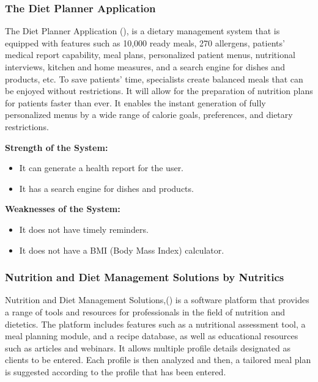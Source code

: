 \documentclass{article}
\begin{document}
\subsubsection{The Diet Planner Application}

The Diet Planner Application (\cite{dietplannerapp}), is a dietary management system that is equipped with features such as 10,000 ready meals, 270 allergens, patients' medical report capability, meal plans, personalized patient menus, nutritional interviews, kitchen and home measures, and a search engine for dishes and products, etc. To save patients' time, specialists create balanced meals that can be enjoyed without restrictions. It will allow for the preparation of nutrition plans for patients faster than ever. It enables the instant generation of fully personalized menus by a wide range of calorie goals, preferences, and dietary restrictions.

\textbf{Strength of the System:}
\begin{itemize}
\item It can generate a health report for the user.
\item It has a search engine for dishes and products.
\end{itemize}

\textbf{Weaknesses of the System:}
\begin{itemize}
\item It does not have timely reminders.
\item It does not have a BMI (Body Mass Index) calculator.
\end{itemize}

\subsubsection{Nutrition and Diet Management Solutions by Nutritics}

Nutrition and Diet Management Solutions,(\cite{nutritics}) is a software platform that provides a range of tools and resources for professionals in the field of nutrition and dietetics. The platform includes features such as a nutritional assessment tool, a meal planning module, and a recipe database, as well as educational resources such as articles and webinars. It allows multiple profile details designated as clients to be entered. Each profile is then analyzed and then, a tailored meal plan is suggested according to the profile that has been entered.
\end{document}
